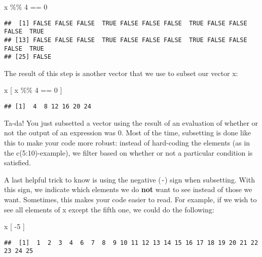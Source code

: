 \documentclass[
]{article}
\newenvironment{Shaded}{\begin{snugshade}}{\end{snugshade}}
\newcommand{\DecValTok}[1]{\textcolor[rgb]{0.00,0.00,0.81}{#1}}
\newcommand{\NormalTok}[1]{#1}
\newcommand{\SpecialCharTok}[1]{\textcolor[rgb]{0.00,0.00,0.00}{#1}}
\begin{document}
\begin{Shaded}
\begin{Highlighting}[]
\NormalTok{x }\SpecialCharTok{\%\%} \DecValTok{4} \SpecialCharTok{==} \DecValTok{0}
\end{Highlighting}
\end{Shaded}

\begin{verbatim}
##  [1] FALSE FALSE FALSE  TRUE FALSE FALSE FALSE  TRUE FALSE FALSE FALSE  TRUE
## [13] FALSE FALSE FALSE  TRUE FALSE FALSE FALSE  TRUE FALSE FALSE FALSE  TRUE
## [25] FALSE
\end{verbatim}

The result of this step is another vector that we use to subset our
vector x:

\begin{Shaded}
\begin{Highlighting}[]
\NormalTok{x [ x }\SpecialCharTok{\%\%} \DecValTok{4} \SpecialCharTok{==} \DecValTok{0}\NormalTok{ ]}
\end{Highlighting}
\end{Shaded}

\begin{verbatim}
## [1]  4  8 12 16 20 24
\end{verbatim}

Ta-da! You just subsetted a vector using the result of an evaluation of
whether or not the output of an expression was 0. Most of the time,
subsetting is done like this to make your code more robust: instead of
hard-coding the elements (as in the c(5:10)-example), we filter based on
whether or not a particular condition is satisfied.

A last helpful trick to know is using the negative (\texttt{-}) sign
when subsetting. With this sign, we indicate which elements we do
\textbf{not} want to see instead of those we want. Sometimes, this makes
your code easier to read. For example, if we wish to see all elements of
x except the fifth one, we could do the following:

\begin{Shaded}
\begin{Highlighting}[]
\NormalTok{x [ }\SpecialCharTok{{-}}\DecValTok{5}\NormalTok{ ]}
\end{Highlighting}
\end{Shaded}

\begin{verbatim}
##  [1]  1  2  3  4  6  7  8  9 10 11 12 13 14 15 16 17 18 19 20 21 22 23 24 25
\end{verbatim}
\end{document}
